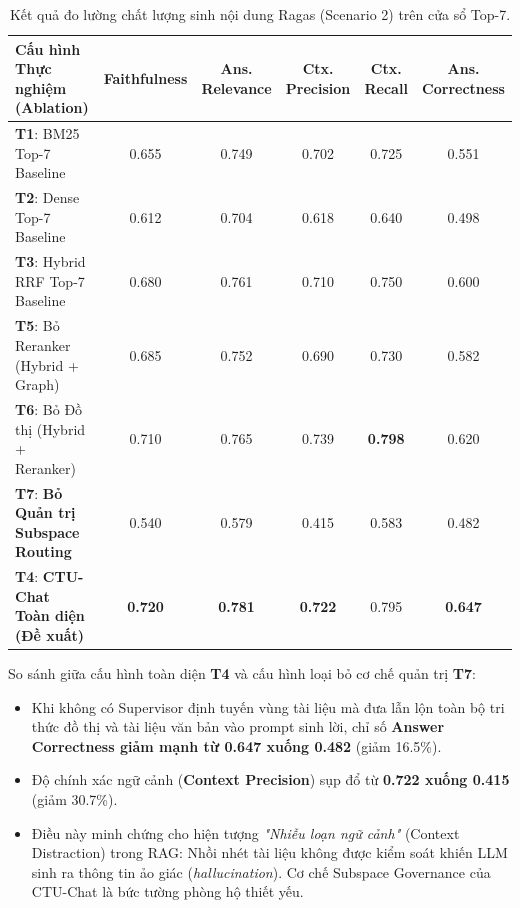 \documentclass[a4paper,10pt]{article}
\begin{document}
\begin{table}[h!]
\centering
\small
\renewcommand{\arraystretch}{1.2}
\begin{tabularx}{\textwidth}{X c c c c c}
\toprule
\rowcolor{tableheader}
\textbf{Cấu hình Thực nghiệm (Ablation)} & \textbf{Faithfulness} & \textbf{Ans. Relevance} & \textbf{Ctx. Precision} & \textbf{Ctx. Recall} & \textbf{Ans. Correctness} \\
\midrule
\textbf{T1}: BM25 Top-7 Baseline & 0.655 & 0.749 & 0.702 & 0.725 & 0.551 \\
\textbf{T2}: Dense Top-7 Baseline & 0.612 & 0.704 & 0.618 & 0.640 & 0.498 \\
\textbf{T3}: Hybrid RRF Top-7 Baseline & 0.680 & 0.761 & 0.710 & 0.750 & 0.600 \\
\textbf{T5}: Bỏ Reranker (Hybrid + Graph) & 0.685 & 0.752 & 0.690 & 0.730 & 0.582 \\
\textbf{T6}: Bỏ Đồ thị (Hybrid + Reranker) & 0.710 & 0.765 & 0.739 & \textbf{0.798} & 0.620 \\
\textbf{T7}: \textbf{Bỏ Quản trị Subspace Routing} & 0.540 & 0.579 & 0.415 & 0.583 & 0.482 \\
\midrule
\rowcolor{successbg}
\textbf{T4}: \textbf{CTU-Chat Toàn diện (Đề xuất)} & \textbf{0.720} & \textbf{0.781} & \textbf{0.722} & 0.795 & \textbf{0.647} \\
\bottomrule
\end{tabularx}
\caption{Kết quả đo lường chất lượng sinh nội dung Ragas (Scenario 2) trên cửa sổ Top-7.}
\label{tab:ragas_scen2}
\end{table}

\begin{warnbox}
So sánh giữa cấu hình toàn diện \textbf{T4} và cấu hình loại bỏ cơ chế quản trị \textbf{T7}:
\begin{itemize}[itemsep=1.5pt,topsep=1.5pt]
    \item Khi không có Supervisor định tuyến vùng tài liệu mà đưa lẫn lộn toàn bộ tri thức đồ thị và tài liệu văn bản vào prompt sinh lời, chỉ số \textbf{Answer Correctness giảm mạnh từ 0.647 xuống 0.482} (giảm 16.5\%).
    \item Độ chính xác ngữ cảnh (\textbf{Context Precision}) sụp đổ từ \textbf{0.722 xuống 0.415} (giảm 30.7\%).
    \item Điều này minh chứng cho hiện tượng \textit{"Nhiễu loạn ngữ cảnh"} (Context Distraction) trong RAG: Nhồi nhét tài liệu không được kiểm soát khiến LLM sinh ra thông tin ảo giác (\textit{hallucination}). Cơ chế Subspace Governance của CTU-Chat là bức tường phòng hộ thiết yếu.
\end{itemize}
\end{warnbox}
\end{document}
